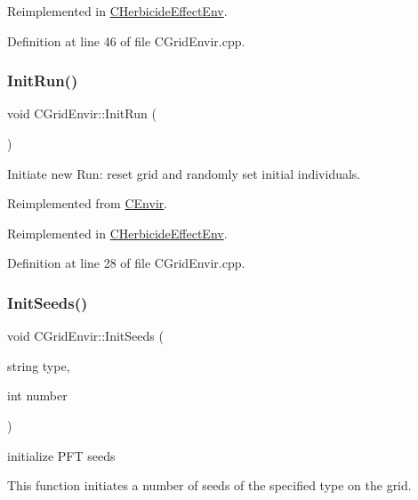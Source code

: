 Reimplemented in \mbox{\hyperlink{class_c_herbicide_effect_env_a4382fa3250eb3b44613707fdffd77838}{C\+Herbicide\+Effect\+Env}}.



Definition at line 46 of file C\+Grid\+Envir.\+cpp.

\mbox{\label{class_c_grid_envir_a5db9b9b5fb26f6f6cbc3b3904ace0b68}} 
\subsubsection{\texorpdfstring{InitRun()}{InitRun()}}
{\footnotesize\ttfamily void C\+Grid\+Envir\+::\+Init\+Run (\begin{DoxyParamCaption}{ }\end{DoxyParamCaption})\hspace{0.3cm}{\ttfamily [virtual]}}

Initiate new Run\+: reset grid and randomly set initial individuals. 

Reimplemented from \mbox{\hyperlink{class_c_envir_af361384ae8ac1d909c2be355ecb19987}{C\+Envir}}.



Reimplemented in \mbox{\hyperlink{class_c_herbicide_effect_env_a307a82e619105086fd02eca98c48f8b6}{C\+Herbicide\+Effect\+Env}}.



Definition at line 28 of file C\+Grid\+Envir.\+cpp.

\mbox{\label{class_c_grid_envir_a7ade5ae05bab7f0fd7f6edef26001686}} 
\subsubsection{\texorpdfstring{InitSeeds()}{InitSeeds()}}
{\footnotesize\ttfamily void C\+Grid\+Envir\+::\+Init\+Seeds (\begin{DoxyParamCaption}\item[{string}]{type,  }\item[{int}]{number }\end{DoxyParamCaption})}



initialize P\+FT seeds 

This function initiates a number of seeds of the specified type on the grid.


